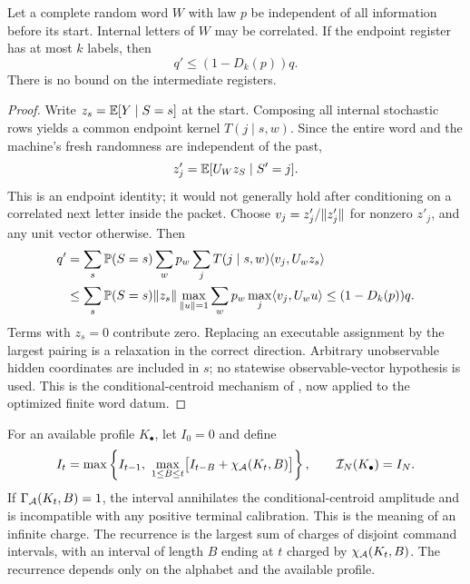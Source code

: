 \begin{lemma}\label{lem:packet}
Let a complete random word $W$ with law $p$ be independent of all information before its start. Internal letters of $W$ may be correlated. If the endpoint register has at most $k$ labels, then
\begin{equation}\label{eq:packet-contraction}
                       q'\le(1-D_k(p))q.
\end{equation}
There is no bound on the intermediate registers.
\end{lemma}
\begin{proof}
Write $z_s=\mathbb E[Y\mid S=s]$ at the start. Composing all internal stochastic rows yields a common endpoint kernel $T(j\mid s,w)$. Since the entire word and the machine's fresh randomness are independent of the past,
\[
 z'_j=\mathbb E[U_Wz_S\mid S'=j].
\]
This is an endpoint identity; it would not generally hold after conditioning on a correlated next letter inside the packet. Choose $v_j=z'_j/\lVert z'_j\rVert$ for nonzero $z'_j$, and any unit vector otherwise. Then
\begin{align*}
 q'&=\sum_s\mathbb P(S=s)\sum_w p_w\sum_jT(j\mid s,w)\langle v_j,U_wz_s\rangle\\
 &\le\sum_s\mathbb P(S=s)\lVert z_s\rVert
       \max_{\lVert u\rVert=1}\sum_w p_w\max_j\langle v_j,U_wu\rangle
 \le(1-D_k(p))q.
\end{align*}
Terms with $z_s=0$ contribute zero. Replacing an executable assignment by the largest pairing is a relaxation in the correct direction. Arbitrary unobservable hidden coordinates are included in $s$; no statewise observable-vector hypothesis is used. This is the conditional-centroid mechanism of \cite{GTF35,GTF42}, now applied to the optimized finite word datum.
\end{proof}

For an available profile $K_\bullet$, let $I_0=0$ and define
\begin{equation}\label{eq:interval-recursion}
 I_t=\max\left\{I_{t-1},\ 
        \max_{1\le B\le t}\bigl[I_{t-B}+\chi_{\calA}(K_t,B)\bigr]\right\},
 \qquad \mathcal I_N(K_\bullet)=I_N.
\end{equation}
If $\Gamma_{\mathcal A}(K_t,B)=1$, the interval annihilates the conditional-centroid amplitude and is incompatible with any positive terminal calibration. This is the meaning of an infinite charge. The recurrence is the largest sum of charges of disjoint command intervals, with an interval of length $B$ ending at $t$ charged by $\chi_{\mathcal A}(K_t,B)$. The recurrence depends only on the alphabet and the available profile.

